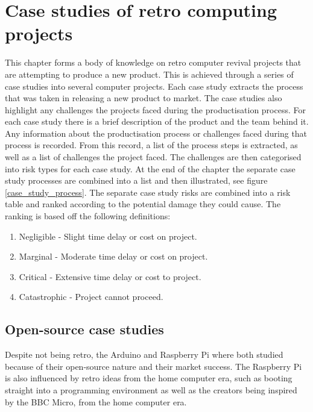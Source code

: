 

\chapter{Case studies of retro computing projects}
\label{Chapter3}
This chapter forms a body of knowledge on retro computer revival projects that are attempting to produce a new product. This is achieved through a series of case studies into several computer projects. Each case study extracts the process that was taken in releasing a new product to market. The case studies also highlight any challenges the projects faced during the productisation process. For each case study there is a brief description of the product and the team behind it. Any information about the productisation process or challenges faced during that process is recorded. From this record, a list of the process steps is extracted, as well as a list of challenges the project faced. The challenges are then categorised into risk types for each case study. At the end of the chapter the separate case study processes are combined into a list and then illustrated, see figure \ref{case_study_process}. The separate case study risks are combined into a risk table and ranked according to the potential damage they could cause. The ranking is based off the following definitions:
\begin{enumerate}
\item Negligible 	- Slight time delay or cost on project.
\item Marginal 		- Moderate time delay or cost on project. 
\item Critical 		- Extensive time delay or cost to project.
\item Catastrophic 	- Project cannot proceed.
\end{enumerate}

\section{Open-source case studies}
Despite not being retro, the Arduino and Raspberry Pi where both studied because of their open-source nature and their market success. The Raspberry Pi is also influenced by retro ideas from the home computer era, such as booting straight into a programming environment as well as the creators being inspired by the BBC Micro, from the home computer era.

